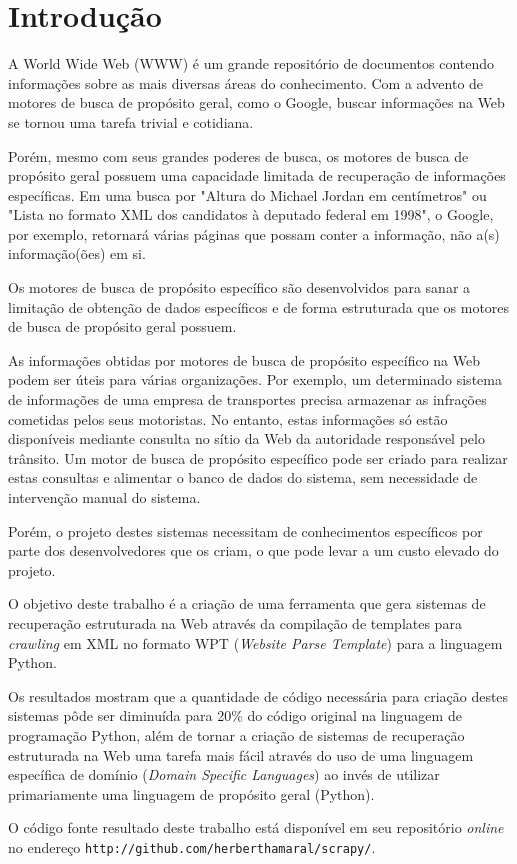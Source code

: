 \chapter{Introdução}
\thispagestyle{fancy}

A World Wide Web (WWW) é um grande repositório de documentos contendo informações sobre as mais diversas áreas do conhecimento. Com a advento de motores de busca de propósito geral, como o Google, buscar informações na Web se tornou uma tarefa trivial e cotidiana.

Porém, mesmo com seus grandes poderes de busca, os motores de busca de propósito geral possuem uma capacidade limitada de recuperação de informações específicas. Em uma busca por "Altura do Michael Jordan em centímetros" ou "Lista no formato XML dos candidatos à deputado federal em 1998", o Google, por exemplo, retornará várias páginas que possam conter a informação, não a(s) informação(ões) em si.

Os motores de busca de propósito específico são desenvolvidos para sanar a limitação de obtenção de dados específicos e de forma estruturada que os motores de busca de propósito geral possuem.

As informações obtidas por motores de busca de propósito específico na Web podem ser úteis para várias organizações. Por exemplo, um determinado sistema de informações de uma empresa de transportes precisa armazenar as infrações cometidas pelos seus motoristas. No entanto, estas informações só estão disponíveis mediante consulta no sítio da Web da autoridade responsável pelo trânsito. Um motor de busca de propósito específico pode ser criado para realizar estas consultas e alimentar o banco de dados do sistema, sem necessidade de intervenção manual do sistema.

Porém, o projeto destes sistemas necessitam de conhecimentos específicos por parte dos desenvolvedores que os criam, o que pode levar a um custo elevado do projeto.

O objetivo deste trabalho é a criação de uma ferramenta que gera sistemas de recuperação estruturada na Web através da compilação de templates para \emph{crawling} em XML no formato WPT (\emph{Website Parse Template}) para a linguagem Python.

Os resultados mostram que a quantidade de código necessária para criação destes sistemas pôde ser diminuída para 20\% do código original na linguagem de programação Python, além de tornar a criação de sistemas de recuperação estruturada na Web uma tarefa mais fácil através do uso de uma linguagem específica de domínio (\emph{Domain Specific Languages}) ao invés de utilizar primariamente uma linguagem de propósito geral (Python).

O código fonte resultado deste trabalho está disponível em seu repositório \emph{online} no endereço \texttt{http://github.com/herberthamaral/scrapy/}.